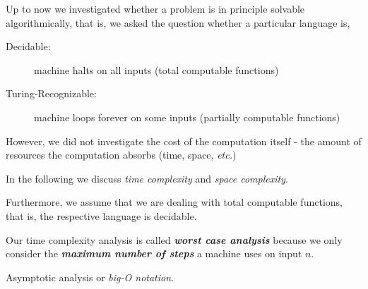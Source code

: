 \documentclass[a4paper,blends,pdf,colorBG,slideColor]{prosper}
\begin{document}
Up to now we investigated whether a problem is in principle solvable algorithmically,
that is, we asked the question whether a particular language is,
\begin{description}
\item[Decidable:] machine
halts on all inputs (total computable functions)
\item[Turing-Recognizable:] machine loops forever on some inputs (partially computable functions)
\end{description}
However, we did not investigate the cost of the computation itself - the amount of resources
the computation absorbs (time, space, {\em etc.})

In the following we discuss {\em time complexity} and {\em space complexity}.

Furthermore, we assume that we are dealing with total computable functions, that is,
the respective language is decidable.
\es



Our time complexity analysis is called {\bf\em worst case analysis} because we only
consider the {\bf\em maximum number of steps} a machine uses on input $n$.
\es

\vspace{.2in}
Asymptotic analysis or {\em big-O notation}.

\es
\end{document}
